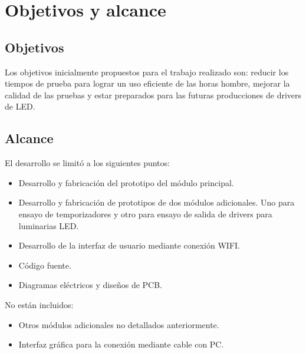 \section{Objetivos y alcance}
\subsection{Objetivos}
Los objetivos inicialmente propuestos para el trabajo realizado son: reducir los tiempos de prueba para lograr un uso eficiente de las horas hombre, mejorar la calidad de las pruebas y estar preparados para las futuras producciones de drivers de LED.
\subsection{Alcance}
El desarrollo se limitó a los siguientes puntos:
\begin{itemize}
	\item Desarrollo y fabricación del prototipo del módulo principal.
	\item Desarrollo y fabricación de prototipos de dos módulos adicionales. Uno para ensayo de 			temporizadores y otro para ensayo de salida de drivers para luminarias LED.
	\item Desarrollo de la interfaz de usuario mediante conexión WIFI.	
	\item Código fuente.
	\item Diagramas eléctricos y diseños de PCB.
\end{itemize}

No están incluidos:

\begin{itemize}
	\item Otros módulos adicionales no detallados anteriormente.
	\item Interfaz gráfica para la conexión mediante cable con PC.
\end{itemize}





